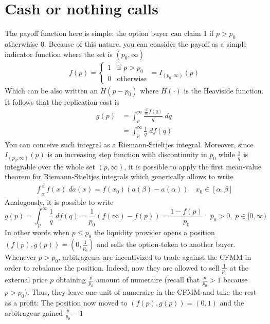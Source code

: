 \documentclass[12pt]{article}
\begin{document}
\section{Cash or nothing calls}
The payoff function here is simple: the option buyer can claim 1 if $p> p_0$ otherwhise 0. Because of this nature, you can consider the payoff as a simple indicator function where the set is $(p_0,\infty)$
\begin{align*}
    f(p) = \begin{cases}
               1 & \text{if } p>p_0 \\
               0 & \text{otherwise}
           \end{cases} = I_{(p_0,\infty)}(p)
\end{align*}
Which can be also written an $H(p-p_0)$ where $H(\cdot)$ is the Heaviside function.\newline
It follows that the replication cost is
\begin{align*}
    g(p) & =\int_{p}^{\infty}\frac{\frac{d}{dq}f(q)}{q}  \; dq \\
         & =\int_{p}^{\infty}\frac{1}{q}  \; df(q)
\end{align*}
You can conceive such integral as a Riemann-Stieltjes integral. Moreover, since $I_{(p_0,\infty)}(p)$ is an increasing step function with discontinuity in $p_0$ while $\frac{1}{q}$ is integrable over the whole set $(p,\infty)$, it is possible to apply the first mean-value theorem for Riemann-Stieltjes integrals which generically allows to write
\begin{align*}
    \int_\alpha^\beta f(x) \; da(x) = f(x_0) (a(\beta)-a(\alpha))\quad x_0\in[\alpha,\beta]
\end{align*}
Analogously, it is possible to write
\begin{equation}
    g(p)=\int_{p}^{\infty}\frac{1}{q}  \; df(q)=\frac{1}{p_0}(f(\infty)-f(p))=\frac{1-f(p)}{p_0} \quad p_0>0, \; p\in[0,\infty) \label{eq:12}
\end{equation}
In other words when $p\leq p_0$ the liquidity provider opens a position $(f(p),g(p))=\left(0,\frac{1}{p_0}\right)$ and sells the option-token to another buyer.
Whenever $p>p_0$, arbitrageurs are incentivized to trade against the CFMM in order to rebalance the position. Indeed, now they are allowed to sell $\frac{1}{p_0}$ at the external price $p$ obtaining $\frac{p}{p_0}$ amount of numeraire (recall that $\frac{p}{p_0}>1 $ because $ p>p_0$). Thus, they leave one unit of numeraire in the CFMM and take the rest as a profit: The position now moved to $(f(p),g(p))=(0,1)$ and the arbitrageur gained $\frac{p}{p_0}-1$
\end{document}
